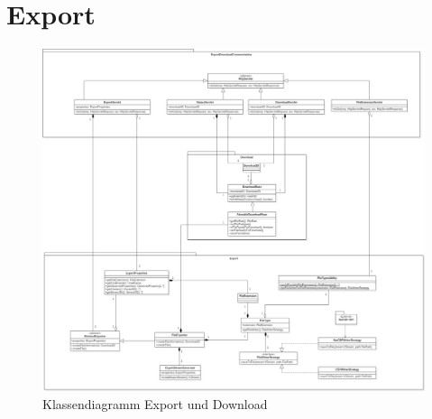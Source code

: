 \chapter{Export}
\begin{figure}[!hbp]
	\centering\includegraphics[width=\linewidth]{images/export/PackagedExportClassDiagram.png}
	\caption{Klassendiagramm Export und Download}
\end{figure}
